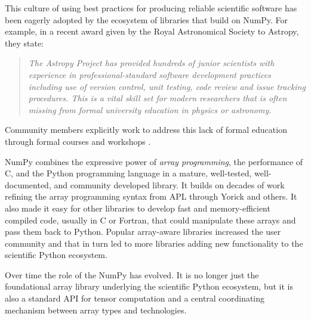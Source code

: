 
This culture of using best practices for producing reliable scientific software
has been eagerly adopted by the ecosystem of libraries that build on NumPy.
For example, in a recent award given by the Royal Astronomical Society to
Astropy, they state:
\begin{quotation}
\noindent\emph{The Astropy Project has provided hundreds of junior scientists
with experience in professional-standard software development practices
including use of version control, unit testing, code review and issue tracking
procedures. This is a vital skill set for modern researchers that is often
missing from formal university education in physics or astronomy.}
\end{quotation}
Community members explicitly work to address this lack of formal education
through formal courses and workshops
\cite{wilson-software-carpentry,hannay-scientific-software-survey,millman2018teaching}.

NumPy combines the expressive power of \emph{array programming}, 
the performance of C, and the Python programming language in a mature,
well-tested, well-documented, and community developed library.
It builds on decades of work refining the array programming
syntax from APL through Yorick and others.
It also made it easy for other libraries to develop fast and
memory-efficient compiled code, usually in C or Fortran, that could manipulate
these arrays and pass them back to Python.
Popular array-aware libraries increased the user community and that
in turn led to more libraries adding new functionality
to the scientific Python ecosystem.


Over time the role of the NumPy has evolved. It is no longer just the
foundational array library underlying the scientific Python ecosystem,
but it is also a standard API for tensor computation and a
central coordinating mechanism between array types and technologies.
